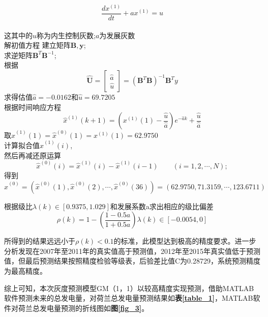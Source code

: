 \documentclass[bwprint]{gmcmthesis}
\numberwithin{figure}{section}
\newcommand{\upcite}[1]{\textsuperscript{\textsuperscript{\cite{#1}}}}
\begin{document}
\begin{equation} 
  \frac{dx^{(1)}}{dt}+ax^{(1)}=u\label{math_1} 
\end{equation}\\
这其中的$u$称为内生控制灰数;$a$为发展灰数\\解初值方程
建立矩阵$\mathbf{B , y}$;\\
求逆矩阵$ \mathbf{B}^T\mathbf{B}^{-1} $;\\
根据
\begin{equation} 
	\hat{\mathbf{U}} = \begin{bmatrix}\hat{a}\\ \hat{u}\end{bmatrix}=(\mathbf{B}^T\mathbf{B})^{-1}\mathbf{B}^{T}y \label{math_2} 
\end{equation}
求得估值$\hat{a}=-0.0162$和$\hat{u}=69.7205$\\
根据时间响应方程
\begin{equation}
	\hat{x}^{(1)}(k+1)=(x^{(1)}(1)-\frac{\hat{u}}{\hat{a}})e^{-\hat{a}k}+\frac{\hat{u}}{\hat{a}}
\end{equation}
取$\hat{x}^{(1)}(1)=\hat{x}^{(0)}(1)=x^{(1)}(1)=62.9750$\\
计算拟合值$\hat{x}^{(1)}(i)$,\\ 然后再减还原运算\\
\begin{equation} 
\hat{x}^{(0)}(i)=\hat{x}^{(1)}(i)-\hat{x}^{(1)}(i-1)  \qquad  (i=1,2,\cdots ,N) \bm ; \label{math_3}  
\end{equation}
得到$\hat{x}^{(0)}=(\hat{x}^{(0)}(1),\hat{x}^{(0)}(2),\cdots ,\hat{x}^{(0)}(36))=(62.9750,71.3159,\cdots,123.6711)$

根据级比$\lambda(k)\in[0.9375,1.029]$和发展系数a求出相应的级比偏差\[\rho(k)=1-(\frac{1-0.5a}{1+0.5a})\lambda (k) \in [-0.0054,0]\]

所得到的结果远远小于$\rho(k)<0.1$的标准，此模型达到极高的精度要求。进一步分析发现在2007年至2011年的真实值高于预测值，2012年至2015年真实值低于预测值，但最后预测结果按照精度检验等级表，后验差比值C为0.28729，系统预测精度为最高精度。\upcite{xiaoai}

综上可知，本次灰度预测模型GM（1，1）以较高精度实现预测，借助MATLAB软件预测未来的总发电量，对荷兰总发电量预测结果如\textbf{表\ref{table_1}}，MATLAB软件对荷兰总发电量预测的折线图如\textbf{图\ref{fig_3}}。
\end{document}
